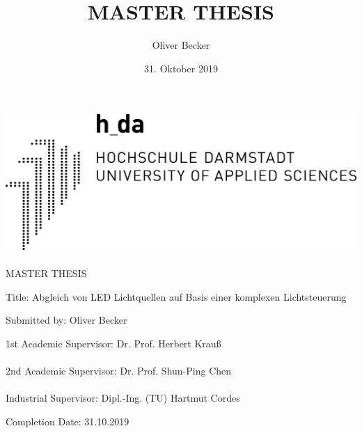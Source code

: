 \documentclass[11pt]{scrartcl}
\title{MASTER THESIS}
\author{Oliver Becker}
\date{31. Oktober 2019} %
\begin{document}
\begin{center}
    \center\includegraphics[width=0.4\linewidth]{logo.png}
    \paragraph{}
    \huge MASTER THESIS
\end{center}
\vspace{2cm}\noindent
{\large Title:  Abgleich von LED Lichtquellen auf Basis einer komplexen Lichtsteuerung}
\par\vspace{4cm}\noindent
Submitted by:   Oliver Becker\\
\par\vspace{2cm}\noindent
1st Academic Supervisor:    Dr. Prof. Herbert Krauß\\
\\
2nd Academic Supervisor:    Dr. Prof. Shun-Ping Chen\\
\\
Industrial Supervisor:      Dipl.-Ing. (TU) Hartmut Cordes\\
\par\vspace{2cm}\noindent
Completion Date:    31.10.2019
\clearpage

\tableofcontents
\clearpage
\end{document}

